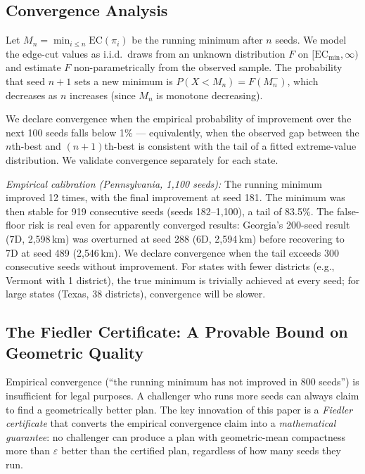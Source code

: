 \subsection{Convergence Analysis}
\label{sec:methodology:convergence}

Let $M_n = \min_{i \leq n} \mathrm{EC}(\pi_i)$ be the running minimum after
$n$ seeds. We model the edge-cut values as i.i.d.\ draws from an unknown
distribution $F$ on $[\mathrm{EC}_{\min}, \infty)$ and estimate $F$
non-parametrically from the observed sample. The probability that seed $n+1$
sets a new minimum is $P(X < M_n) = F(M_n^-)$, which decreases as $n$
increases (since $M_n$ is monotone decreasing).

We declare convergence when the empirical probability of improvement over the
next 100 seeds falls below 1\% --- equivalently, when the observed gap between
the $n$th-best and $(n+1)$th-best is consistent with the tail of a fitted
extreme-value distribution. We validate convergence separately for each state.

\emph{Empirical calibration (Pennsylvania, 1{,}100 seeds):} The running minimum
improved 12 times, with the final improvement at seed 181. The minimum was then
stable for 919 consecutive seeds (seeds 182--1{,}100), a tail of 83.5\%.
The false-floor risk is real even for apparently converged results: Georgia's
200-seed result (7D, 2{,}598\,km) was overturned at seed 288 (6D, 2{,}594\,km)
before recovering to 7D at seed 489 (2{,}546\,km). We declare convergence when
the tail exceeds 300 consecutive seeds without improvement.
For states with fewer districts (e.g., Vermont with 1 district), the true
minimum is trivially achieved at every seed; for large states (Texas, 38
districts), convergence will be slower.

\subsection{The Fiedler Certificate: A Provable Bound on Geometric Quality}
\label{sec:methodology:certificate}

Empirical convergence (``the running minimum has not improved in 800 seeds'')
is insufficient for legal purposes. A challenger who runs more seeds can always
claim to find a geometrically better plan. The key innovation of this paper is a
\emph{Fiedler certificate} that converts the empirical convergence claim into a
\emph{mathematical guarantee}: no challenger can produce a plan with
geometric-mean compactness more than $\varepsilon$ better than the certified
plan, regardless of how many seeds they run.

